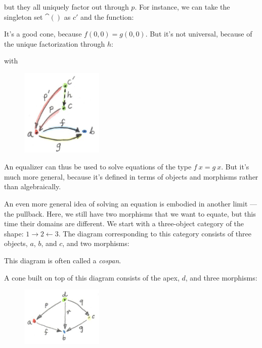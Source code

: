 
but they all uniquely factor out through $p$. For instance, we
can take the singleton set $\cat{()}$ as $c'$ and the
function:


It's a good cone, because $f (0, 0) = g (0, 0)$. But it's
not universal, because of the unique factorization through $h$:


with


\begin{figure}[H]
  \centering
  \includegraphics[width=0.35\textwidth]{images/equilizerlimit.jpg}
\end{figure}

\noindent
An equalizer can thus be used to solve equations of the type
$f~x = g~x$. But it's much more general, because it's defined
in terms of objects and morphisms rather than algebraically.

An even more general idea of solving an equation is embodied in another
limit --- the pullback. Here, we still have two morphisms that we want
to equate, but this time their domains are different. We start with a
three-object category of the shape:
$1\rightarrow2\leftarrow3$. The diagram corresponding to
this category consists of three objects, $a$, $b$, and
$c$, and two morphisms:


This diagram is often called a \emph{cospan}.

A cone built on top of this diagram consists of the apex, $d$,
and three morphisms:


\begin{figure}[H]
  \centering
  \includegraphics[width=0.35\textwidth]{images/pullbackcone.jpg}
\end{figure}

